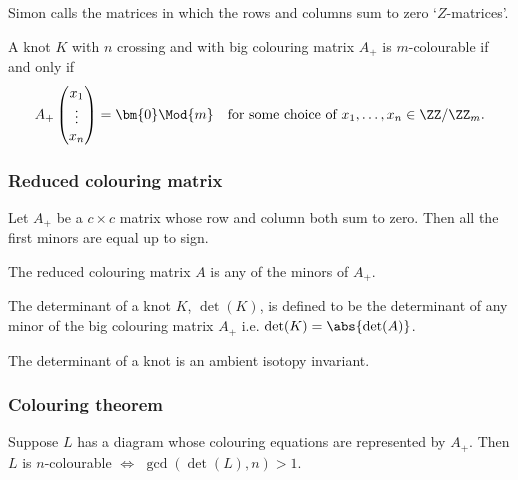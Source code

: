 \documentclass[12pt, a4paper]{article}
\begin{document}
\begin{mdnote}
    Simon calls the matrices in which the rows and columns sum to zero `\(Z\)-matrices'.
\end{mdnote}

\begin{lemma}
    A knot \(K\) with \(n\) crossing and with big colouring matrix \(A_+\) is \(m\)-colourable if and only if 
    \[A_+ \begin{pmatrix} x_1 \\ \vdots \\ x_n \end{pmatrix} = \bm{0} \Mod{m} \quad \text{for some choice of } x_1, \ldots, x_n \in \ZZ/\ZZ_m.\]
\end{lemma}

\subsubsection{Reduced colouring matrix}

\begin{mdprop}
    Let \(A_+\) be a \(c \times c\) matrix whose row and column both sum to zero. Then all the first minors are equal up to sign.
\end{mdprop}

\begin{definition}
    The reduced colouring matrix \(A\) is any of the minors of \(A_+\).
\end{definition}

\begin{definition}
    The determinant of a knot \(K\), \(\det(K)\), is defined to be the determinant of any minor of the big colouring matrix \(A_+\) i.e. \(\det(K)=\abs{\det(A)}\).
\end{definition}

\begin{proposition}
    The determinant of a knot is an ambient isotopy invariant.
\end{proposition}

\subsubsection{Colouring theorem}

\begin{mdthm}
    Suppose \(L\) has a diagram whose colouring equations are represented by \(A_+\). Then \(L\) is \(n\)-colourable \(\iff\) \(\gcd(\det(L),n)>1\).
\end{mdthm}
\end{document}
